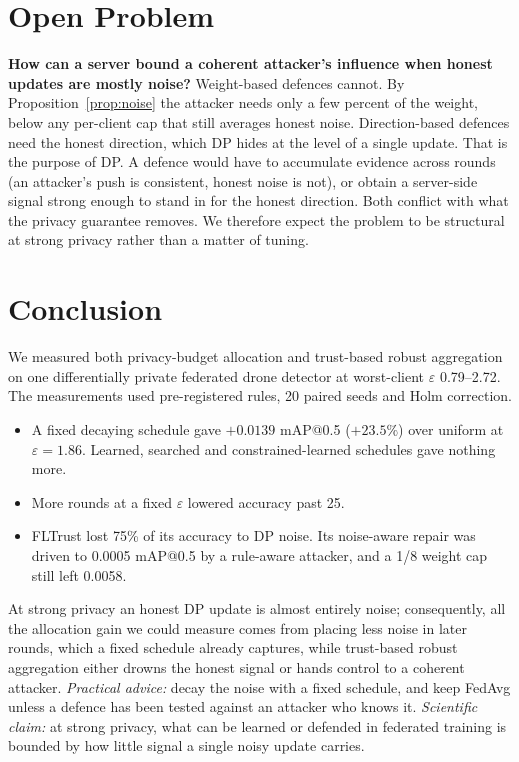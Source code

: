 \documentclass[journal]{IEEEtran}
\makeatletter
\newcommand{\eps}{\varepsilon}
\newcommand{\mAP}{mAP@0.5}
\makeatother
\begin{document}
\section{Open Problem}
\label{sec:open}
\textbf{How can a server bound a coherent attacker's influence when honest updates are mostly noise?}
Weight-based defences cannot. By Proposition~\ref{prop:noise} the attacker needs only a few percent
of the weight, below any per-client cap that still averages honest noise. Direction-based defences
need the honest direction, which DP hides at the level of a single update. That is the purpose of DP.
A defence would have to accumulate evidence across rounds (an attacker's push is consistent, honest
noise is not), or obtain a server-side signal strong enough to stand in for the honest direction.
Both conflict with what the privacy guarantee removes. We therefore expect the problem to be
structural at strong privacy rather than a matter of tuning.

\section{Conclusion}
\label{sec:conclusion}
We measured both privacy-budget allocation and trust-based robust aggregation on one differentially
private federated drone detector at worst-client $\eps$ 0.79--2.72. The measurements used
pre-registered rules, 20 paired seeds and Holm correction.
\begin{itemize}
  \item A fixed decaying schedule gave $+0.0139$ \mAP{} ($+23.5\%$) over uniform at $\eps = 1.86$.
  Learned, searched and constrained-learned schedules gave nothing more.
  \item More rounds at a fixed $\eps$ lowered accuracy past 25.
  \item FLTrust lost 75\% of its accuracy to DP noise. Its noise-aware repair was driven to 0.0005
  \mAP{} by a rule-aware attacker, and a 1/8 weight cap still left 0.0058.
\end{itemize}
At strong privacy an honest DP update is almost entirely noise; consequently, all the allocation
gain we could measure comes from placing less noise in later rounds, which a fixed schedule already
captures, while trust-based robust aggregation either drowns the honest signal or hands control to a
coherent attacker.
\emph{Practical advice:} decay the noise with a fixed schedule, and keep FedAvg unless a defence has
been tested against an attacker who knows it.
\emph{Scientific claim:} at strong privacy, what can be learned or defended in federated training is
bounded by how little signal a single noisy update carries.
\end{document}
